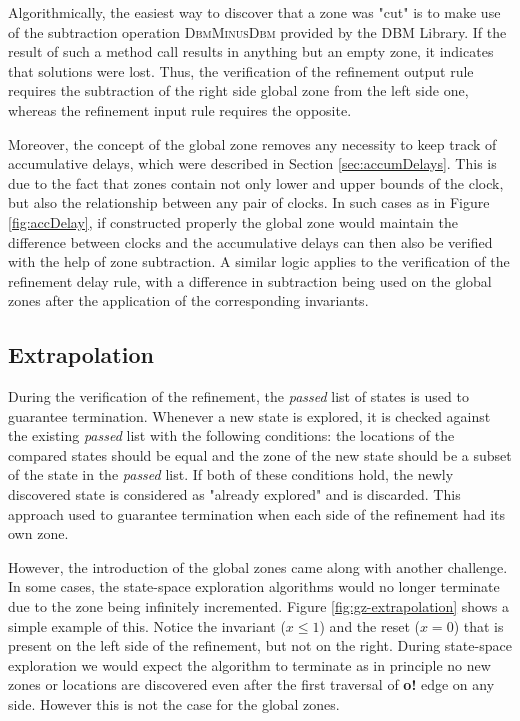 Algorithmically, the easiest way to discover that a zone was "cut" is to make use of the subtraction operation \textsc{DbmMinusDbm} provided by the DBM Library. If the result of such a method call results in anything but an empty zone, it indicates that solutions were lost. Thus, the verification of the refinement output rule requires the subtraction of the right side global zone from the left side one, whereas the refinement input rule requires the opposite.

Moreover, the concept of the global zone removes any necessity to keep track of accumulative delays, which were described in Section \ref{sec:accumDelays}. This is due to the fact that zones contain not only lower and upper bounds of the clock, but also the relationship between any pair of clocks. In such cases as in Figure \ref{fig:accDelay}, if constructed properly the global zone would maintain the difference between clocks and the accumulative delays can then also be verified with the help of zone subtraction. A similar logic applies to the verification of the refinement delay rule, with a difference in subtraction being used on the global zones after the application of the corresponding invariants.

\subsection{Extrapolation}
During the verification of the refinement, the \textit{passed} list of states is used to guarantee termination. Whenever a new state is explored, it is checked against the existing \textit{passed} list with the following conditions: the locations of the compared states should be equal and the zone of the new state should be a subset of the state in the \textit{passed} list. If both of these conditions hold, the newly discovered state is considered as "already explored" and is discarded. This approach used to guarantee termination when each side of the refinement had its own zone.

However, the introduction of the global zones came along with another challenge. In some cases, the state-space exploration algorithms would no longer terminate due to the zone being infinitely incremented. Figure \ref{fig:gz-extrapolation} shows a simple example of this. Notice the invariant ($x \leq 1$) and the reset ($x=0$) that is present on the left side of the refinement, but not on the right. During state-space exploration we would expect the algorithm to terminate as in principle no new zones or locations are discovered even after the first traversal of \textbf{o!} edge on any side. However this is not the case for the global zones.

